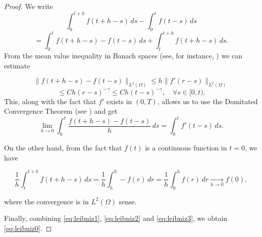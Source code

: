 \documentclass{amsart}
\newcommand{\ele}{L^2(\Omega)}
\theoremstyle{remark}
\theoremstyle{definition}
\numberwithin{equation}{section}
\begin{document}
\begin{proof}
We write 
\begin{equation}
\label{eq:leibniz1}
\int^{t+h}_0 f(t+h -s) \, ds - \int^{t}_0 f(t-s) \, ds
\end{equation}
$$= \int^{t}_0 f(t+h -s) - f(t-s) \, ds + \int^{t+h}_t f(t+h -s) \, ds.$$
From the mean value inequality in Banach spaces (see, for instance, \cite[Appendix B]{tesismikkola}) we can estimate

$$\|f(t+h-s) - f(t-s)\|_{\ele} \leq  h\|f'(r-s)\|_{\ele}$$
$$\leq Ch(r-s)^{-\gamma} \leq Ch(t-s)^{-\gamma}, \quad \forall s \in [0,t).$$
This, along with the fact that $f'$ exists in $(0,T)$, allows us to use the Domitated Convergence Theorem (see \cite[Appendix B]{tesismikkola}) and get 
\begin{equation}
\label{eq:leibniz2}
\lim_{h \to 0} \int^{t}_0 \frac{f(t+h -s) - f(t-s)}{h} \, ds = \int^{t}_0 f'(t -s) \, ds.
\end{equation}


On the other hand, from the fact that $f(t)$ is a continuous function in $t = 0$, we have

\begin{equation}
\label{eq:leibniz3}
\frac{1}{h} \int^{t+h}_{t}f(t+h-s) \, ds = \frac{1}{h} \int^{0}_{h}-f(r) \, dr = \frac{1}{h} \int^{h}_{0}f(r) \, dr \xrightarrow[h \to 0]{} f(0),
\end{equation}

where the convergence is in $\ele$ sense.

Finally, combining \eqref{eq:leibniz1}, \eqref{eq:leibniz2} and \eqref{eq:leibniz3}, we obtain \eqref{eq:leibniz0}. 


\end{proof}
\end{document}
